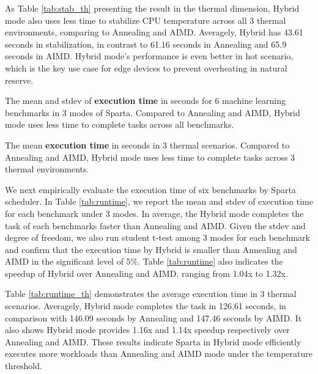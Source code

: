 

As Table \ref{tab:stab_th} presenting the result in the thermal dimension, Hybrid mode also uses less time to stabilize CPU temperature across all 3 thermal environments, comparing to Annealing and AIMD. Averagely, Hybrid has 43.61 seconds in stabilization, in contrast to 61.16 seconds in Annealing and 65.9 seconds in AIMD. Hybrid mode's performance is even better in hot scenario, which is the key use case for edge devices to prevent overheating in natural reserve.

\begin{table}[h!]
\caption{The mean and stdev of \textbf{execution time} in seconds for 6 machine learning benchmarks in 3 modes of Sparta. Compared to Annealing and AIMD, Hybrid mode uses less time to complete tasks across all benchmarks. }\label{tab:runtime}
\vspace{1mm}
\centering
\resizebox{350pt}{!}{}
\end{table}


\begin{table}[h!]
\caption{The mean \textbf{execution time} in seconds in 3 thermal scenarios. Compared to Annealing and AIMD, Hybrid mode uses less time to complete tasks across 3 thermal environments.  }\label{tab:runtime_th}
\vspace{1mm}
\centering
\resizebox{350pt}{!}{}
\end{table}

We next empirically evaluate the execution time of six benchmarks by Sparta scheduler. In Table \ref{tab:runtime}, we report the mean and stdev of execution time for each benchmark under 3 modes. In average, the Hybrid mode completes the task of each benchmarks faster than Annealing and AIMD. Given the stdev and degree of freedom, we also run student t-test among 3 modes for each benchmark and confirm that the execution time by Hybrid is smaller than Annealing and AIMD in the significant level of 5\%. Table \ref{tab:runtime} also indicates the speedup of Hybrid over Annealing and AIMD, ranging from 1.04x to 1.32x. 

Table \ref{tab:runtime_th} demonstrates the average execution time in 3 thermal scenarios. Averagely, Hybrid mode completes the task in 126.61 seconds, in comparison with 146.09 seconds by Annealing and 147.46 seconds by AIMD. It also shows Hybrid mode provides 1.16x and 1.14x speedup respectively over Annealing and AIMD. These results indicate Sparta in Hybrid mode efficiently executes more workloads than Annealing and AIMD mode under the temperature threshold. 


